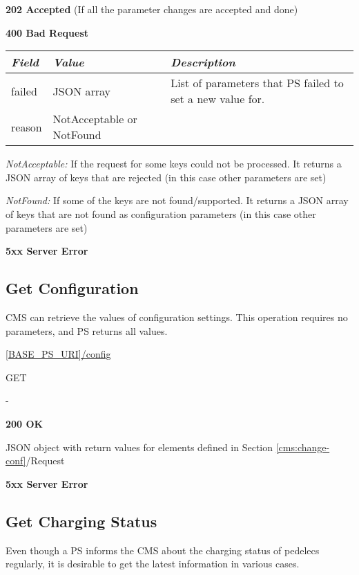 \textbf{202 Accepted} (If all the parameter changes are accepted and done)

 \textbf{400 Bad Request}

\begin{tabularx}{\linewidth}{ | l | X | X | }
  \hline
  \textit{Field} & \textit{Value} & \textit{Description} \\
  \hline \hline
  failed			& JSON array & List of parameters that \acs{PS} failed to set a new value for.\\
  reason 		& NotAcceptable or NotFound & \\
  \hline
\end{tabularx}

\textit{NotAcceptable:} If the request for some keys could not be processed. It returns a JSON array of keys that are rejected (in this case other parameters are set)

\textit{NotFound:} If some of the keys are not found/supported. It returns a JSON array of keys that are not found as configuration parameters (in this case other parameters are set)


\textbf{5xx Server Error}

\subsection{Get Configuration}

\acs{CMS} can retrieve the values of configuration settings. This operation requires no parameters, and \acs{PS} returns all values.

 \url{[BASE_PS_URI]/config}

 GET

 -

 \textbf{200 OK}

JSON object with return values for elements defined in Section \ref{cms:change-conf}/Request

 \textbf{5xx Server Error}

\subsection{Get Charging Status}

Even though a \acs{PS} informs the \acs{CMS} about the charging status of pedelecs regularly, it is desirable to get the latest information in various cases.

